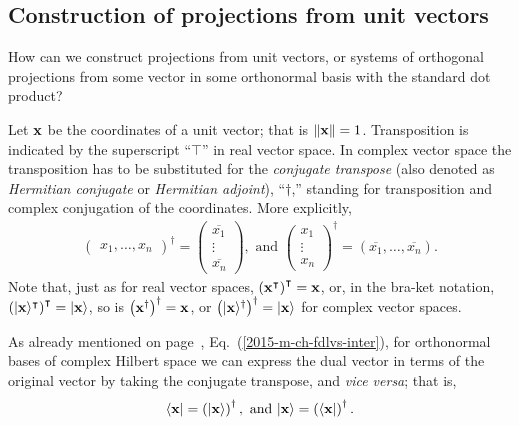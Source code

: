 \subsection{Construction of projections from unit vectors}

How can we construct projections from unit vectors, or systems of orthogonal projections from some vector in some orthonormal basis
with the standard dot product?

Let ${\bf x}$ be the coordinates of a unit vector;
that is $\|{\bf x} \| =1$.
Transposition is indicated by the superscript ``$\intercal$''
in real vector space.
In complex vector space the transposition has to be substituted
 for the {\em conjugate transpose} (also denoted as
{\em Hermitian conjugate} or {\em Hermitian adjoint}),
``$\dagger$,'' standing for transposition and complex conjugation of the coordinates.
More explicitly,
\begin{equation}
\begin{split}
\begin{pmatrix}x_1,\ldots, x_n\end{pmatrix}^\dagger =
\begin{pmatrix}
\overline{x_1}\\ \vdots\\ \overline{x_n}
\end{pmatrix}
,  \textrm{ and }
\begin{pmatrix}
x_1\\ \vdots\\ x_n
\end{pmatrix}^\dagger
= (\overline{x_1},\ldots, \overline{x_n})
.
\end{split}
\end{equation}
Note that, just as for real vector spaces,
$\left({\bf x}^\intercal \right)^\intercal ={\bf x}$,
or, in the bra-ket notation,
$\left(\vert {\bf x}\rangle^\intercal \right)^\intercal =\vert {\bf x}\rangle$,
 so is
$\left({\bf x}^\dagger \right)^\dagger={\bf x}$,
or
$\left(\vert  {\bf x}\rangle ^\dagger \right)^\dagger= \vert{\bf x} \rangle$ for complex vector spaces.

As already mentioned on page~\pageref{2015-m-ch-fdlvs-inter}, Eq.~(\ref{2015-m-ch-fdlvs-inter}), for orthonormal bases of complex Hilbert space
we can express the dual vector in terms of the original vector by
taking the conjugate transpose, and {\em vice versa}; that is,
\begin{equation}
\begin{split}
\langle {\bf x} \vert = \left(\vert {\bf x}\rangle \right)^\dagger,
\textrm{ and }
\vert {\bf x}\rangle  = \left(\langle {\bf x}\vert\right)^\dagger.
\end{split}
\end{equation}


